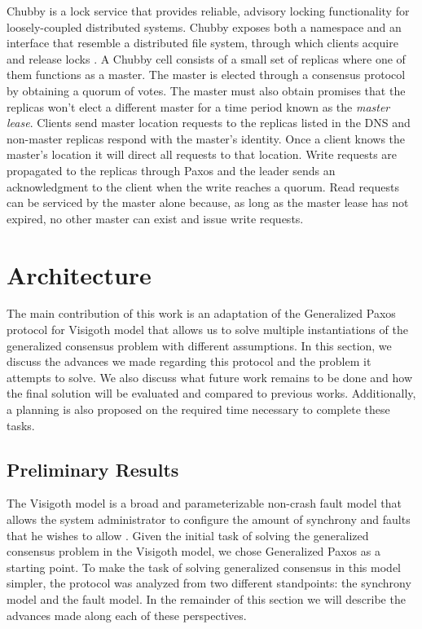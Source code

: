 \documentclass[runningheads,a4paper]{llncs}
\begin{document}
Chubby is a lock service that provides reliable, advisory locking functionality for loosely-coupled distributed systems. Chubby exposes both a namespace and an interface that resemble a distributed file system, through which clients acquire and release locks \cite{Burrows2006}. A Chubby cell consists of a small set of replicas where one of them functions as a master. The master is elected through a consensus protocol by obtaining a quorum of votes. The master must also obtain promises that the replicas won't elect a different master for a time period known as the \textit{master lease}. Clients send master location requests to the replicas listed in the DNS and non-master replicas respond with the master's identity. Once a client knows the master's location it will direct all requests to that location. Write requests are propagated to the replicas through Paxos and the leader sends an acknowledgment to the client when the write reaches a quorum. Read requests can be serviced by the master alone because, as long as the master lease has not expired, no other master can exist and issue write requests.

\section{Architecture}

The main contribution of this work is an adaptation of the Generalized Paxos protocol for Visigoth model that allows us to solve multiple instantiations of the generalized consensus problem with different assumptions. In this section, we discuss the advances we made regarding this protocol and the problem it attempts to solve. We also discuss what future work remains to be done and how the final solution will be evaluated and compared to previous works. Additionally, a planning is also proposed on the required time necessary to complete these tasks.

\subsection{Preliminary Results} \label{Preliminary Results}

The Visigoth model is a broad and parameterizable non-crash fault model that allows the system administrator to configure the amount of synchrony and faults that he wishes to allow \cite{Porto2015}. Given the initial task of solving the generalized consensus problem in the Visigoth model, we chose Generalized Paxos as a starting point. To make the task of solving generalized consensus in this model simpler, the protocol was analyzed from two different standpoints: the synchrony model and the fault model. In the remainder of this section we will describe the advances made along each of these perspectives.  \par
\end{document}
